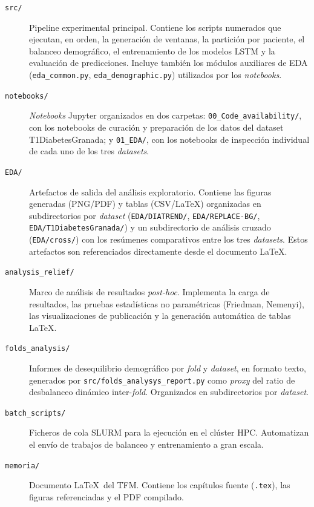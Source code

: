 \begin{description}
    \item[\texttt{src/}] Pipeline experimental principal. Contiene los
    scripts numerados que ejecutan, en orden, la generación de ventanas,
    la partición por paciente, el balanceo demográfico, el entrenamiento
    de los modelos LSTM y la evaluación de predicciones. Incluye también
    los módulos auxiliares de EDA (\texttt{eda\_common.py},
    \texttt{eda\_demographic.py}) utilizados por los \textit{notebooks}.

    \item[\texttt{notebooks/}] \textit{Notebooks} Jupyter organizados en
    dos carpetas: \texttt{00\_Code\_availability/}, con los notebooks de
    curación y preparación de los datos del dataset T1DiabetesGranada; y
    \texttt{01\_EDA/}, con los notebooks de inspección individual de cada
    uno de los tres \textit{datasets}.

    \item[\texttt{EDA/}] Artefactos de salida del análisis exploratorio.
    Contiene las figuras generadas (PNG/PDF) y tablas (CSV/\LaTeX)
    organizadas en subdirectorios por \textit{dataset}
    (\texttt{EDA/DIATREND/}, \texttt{EDA/REPLACE-BG/},
    \texttt{EDA/T1DiabetesGranada/}) y un subdirectorio de análisis
    cruzado (\texttt{EDA/cross/}) con los resúmenes comparativos entre
    los tres \textit{datasets}. Estos artefactos son referenciados
    directamente desde el documento \LaTeX.

    \item[\texttt{analysis\_relief/}] Marco de análisis de resultados
    \textit{post-hoc}. Implementa la carga de resultados, las pruebas
    estadísticas no paramétricas (Friedman, Nemenyi), las
    visualizaciones de publicación y la generación automática de tablas
    \LaTeX.

    \item[\texttt{folds\_analysis/}] Informes de desequilibrio demográfico
    por \textit{fold} y \textit{dataset}, en formato texto, generados por
    \texttt{src/folds\_analysys\_report.py} como \textit{proxy} del ratio
    de desbalanceo dinámico inter-\textit{fold}. Organizados en
    subdirectorios por \textit{dataset}.

    \item[\texttt{batch\_scripts/}] Ficheros de cola SLURM para la
    ejecución en el clúster HPC. Automatizan el envío de trabajos de
    balanceo y entrenamiento a gran escala.

    \item[\texttt{memoria/}] Documento \LaTeX\ del TFM. Contiene los
    capítulos fuente (\texttt{.tex}), las figuras referenciadas y el
    PDF compilado.
\end{description}


